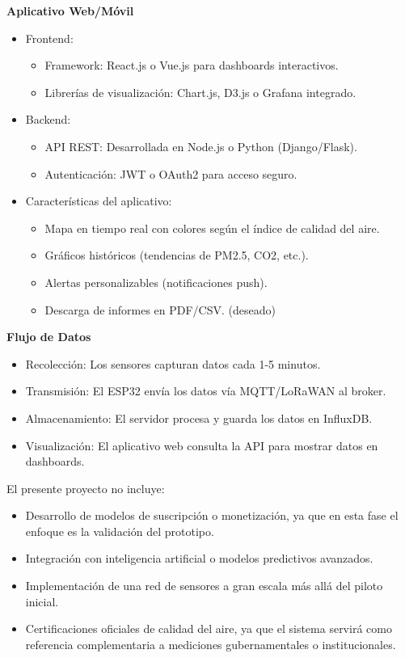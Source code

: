 \documentclass[
11pt, %
]{charter}
\begin{document}
\textbf{Aplicativo Web/Móvil}
\begin{itemize}
	\item Frontend:
	\begin{itemize}
		\item Framework: React.js o Vue.js para dashboards interactivos.
		\item Librerías de visualización: Chart.js, D3.js o Grafana integrado.
	\end{itemize}
	
	\item Backend:
	\begin{itemize}
		\item API REST: Desarrollada en Node.js o Python (Django/Flask).
		\item Autenticación: JWT o OAuth2 para acceso seguro.
	\end{itemize}
	
	\item Características del aplicativo:
	\begin{itemize}
		\item Mapa en tiempo real con colores según el índice de calidad del aire.
		\item Gráficos históricos (tendencias de PM2.5, CO2, etc.).
		\item Alertas personalizables (notificaciones push).
		\item Descarga de informes en PDF/CSV. (deseado)	
	\end{itemize}		
	
\end{itemize}

\textbf{Flujo de Datos}
\begin{itemize}
	\item Recolección: Los sensores capturan datos cada 1-5 minutos.
	\item Transmisión: El ESP32 envía los datos vía MQTT/LoRaWAN al broker.
	\item Almacenamiento: El servidor procesa y guarda los datos en InfluxDB.
	\item Visualización: El aplicativo web consulta la API para mostrar datos en dashboards.
\end{itemize}

El presente proyecto no incluye:
\begin{itemize}
	\item Desarrollo de modelos de suscripción o monetización, ya que en esta fase el enfoque es la validación del prototipo.
	\item Integración con inteligencia artificial o modelos predictivos avanzados.
	\item Implementación de una red de sensores a gran escala más allá del piloto inicial.
	\item Certificaciones oficiales de calidad del aire, ya que el sistema servirá como referencia complementaria a mediciones gubernamentales o institucionales.
\end{itemize}
\end{document}
